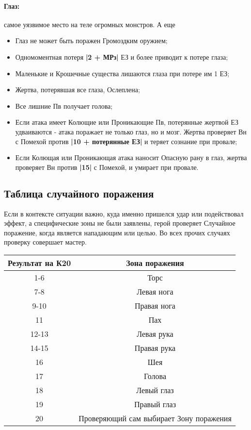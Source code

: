 \paragraph{Глаз:} самое уязвимое место на теле огромных монстров. А еще
\begin{itemize}
  \item Глаз не может быть поражен Громоздким оружием;
  \item Одномоментная потеря \textbf{|2 + МРз|} ЕЗ и более приводит к потере глаза;
  \item Маленькие и Крошечные существа лишаются глаза при потере им 1 ЕЗ;
  \item Жертва, потерявшая все глаза, Ослеплена;
  \item Все лишние Пв получает голова;
  \item Если атака имеет Колющие или Проникающие Пв, потерянные жертвой ЕЗ удваиваются - атака поражает не только глаз, но и мозг. Жертва проверяет Вн с Помехой против \textbf{|10 + потерянные ЕЗ|} и теряет сознание при провале;
  \item Если Колющая или Проникающая атака наносит Опасную рану в глаз, жертва проверяет Вн против \textbf{|15|} с Помехой, и умирает при провале.
\end{itemize}
\subsection{Таблица случайного поражения}
Если в контексте ситуации важно, куда именно пришелся удар или подействовал эффект, а специфические зоны не были заявлены, герой проверяет Случайное поражение, когда является нападающим или целью. Во всех прочих случаях проверку совершает мастер.
\begin{center} \begin{tabular}{|c|c|} \hline
  \textbf{Результат на К20} & \textbf{Зона поражения} \\ \hline
  1-6 & Торс \\ \hline
  7-8 & Левая нога \\ \hline
  9-10 & Правая нога \\ \hline
  11 & Пах \\ \hline
  12-13 & Левая рука \\ \hline
  14-15 & Правая рука \\ \hline
  16 & Шея \\ \hline
  17 & Голова \\ \hline
  18 & Левый глаз \\ \hline
  19 & Правый глаз \\ \hline
  20 & Проверяющий сам выбирает Зону поражения \\ \hline
\end{tabular} \end{center}

